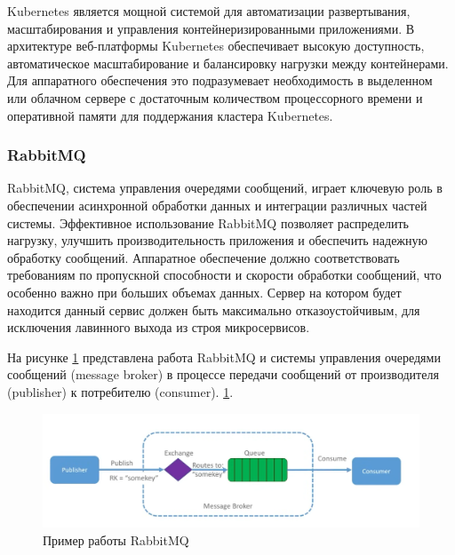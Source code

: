 Kubernetes является мощной системой для автоматизации развертывания, масштабирования и управления контейнеризированными приложениями. В архитектуре веб-платформы Kubernetes обеспечивает высокую доступность, автоматическое масштабирование и балансировку нагрузки между контейнерами. Для аппаратного обеспечения это подразумевает необходимость в выделенном или облачном сервере с достаточным количеством процессорного времени и оперативной памяти для поддержания кластера Kubernetes.

\subsubsection{RabbitMQ}

RabbitMQ, система управления очередями сообщений, играет ключевую роль в обеспечении асинхронной обработки данных и интеграции различных частей системы. Эффективное использование RabbitMQ позволяет распределить нагрузку, улучшить производительность приложения и обеспечить надежную обработку сообщений. Аппаратное обеспечение должно соответствовать требованиям по пропускной способности и скорости обработки сообщений, что особенно важно при больших объемах данных. Сервер на котором будет находится данный сервис должен быть максимально отказоустойчивым, для исключения лавинного выхода из строя микросервисов.

На рисунке \ref{fig:-RabbitMQ} представлена работа RabbitMQ и системы управления очередями сообщений (message broker) в процессе передачи сообщений от производителя (publisher) к потребителю (consumer). \ref{fig:-RabbitMQ}.
\begin{figure}
	\centering
	\includegraphics[width=0.9\linewidth]{"images/RabbitMQ"}
	\caption{Пример работы RabbitMQ}
	\label{fig:-RabbitMQ}
\end{figure}

